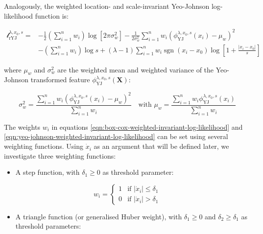 \documentclass[preprint,12pt,authoryear]{elsarticle}
\DeclareMathOperator{\sgn}{sgn}
\begin{document}
Analogously, the weighted location- and scale-invariant Yeo-Johnson
log-likelihood function is:

\begin{equation}
\label{eqn:yeo-johnson-weighted-invariant-log-likelihood}
\begin{split}
\mathcal{l}_{\text{rYJ}}^{\lambda, x_0, s} = & -\frac{1}{2} \left(\sum_{i=1}^n w_i \right) \log \left[ 2 \pi \sigma_w^2 \right] -\frac{1}{2 \sigma_w^2} \sum_{i=1}^n w_i \left( \phi_{\text{YJ}}^{\lambda, x_0, s}(x_i) - \mu_w \right)^2 \\
& - \left( \sum_{i=1}^n w_i \right) \log s + (\lambda - 1) \sum_{i=1}^n w_i \sgn(x_i - x_0) \log \left[1 + \frac{|x_i - x_0|}{s} \right]
\end{split}
\end{equation}

where \(\mu_w\) and \(\sigma^2_w\) are the weighted mean and weighted
variance of the Yeo-Johnson transformed feature
\(\phi_{\text{YJ}}^{\lambda, x_0, s} (\mathbf{X})\):

\begin{equation}
\sigma_w^2 = \frac{\sum_{i=1}^n w_i \left(\phi_{\text{YJ}}^{\lambda, x_0, s} (x_i) - \mu_w \right)^2}{\sum_{i=1}^n w_i} \quad \text{with } \mu_w = \frac{\sum_{i=1}^n w_i \phi_{\text{YJ}}^{\lambda, x_0, s} (x_i)} {\sum_{i=1}^n w_i}
\end{equation}

The weights \(w_i\) in equations
\ref{eqn:box-cox-weighted-invariant-log-likelihood} and
\ref{eqn:yeo-johnson-weighted-invariant-log-likelihood} can be set using
several weighting functions. Using \(\dot{x}_i\) as an argument that
will be defined later, we investigate three weighting functions:

\begin{itemize}
\item
  A step function, with \(\delta_1 \geq 0\) as threshold parameter:
\end{itemize}

\begin{equation}
w_i =
\begin{cases}
1 & \text{if } \left| \dot{x}_i \right| \leq \delta_1\\
0 & \text{if } \left| \dot{x}_i \right| > \delta_1
\end{cases}
\end{equation}

\begin{itemize}
\item
  A triangle function (or generalised Huber weight), with
  \(\delta_1 \geq 0\) and \(\delta_2 \geq \delta_1\) as threshold
  parameters:
\end{itemize}
\end{document}
